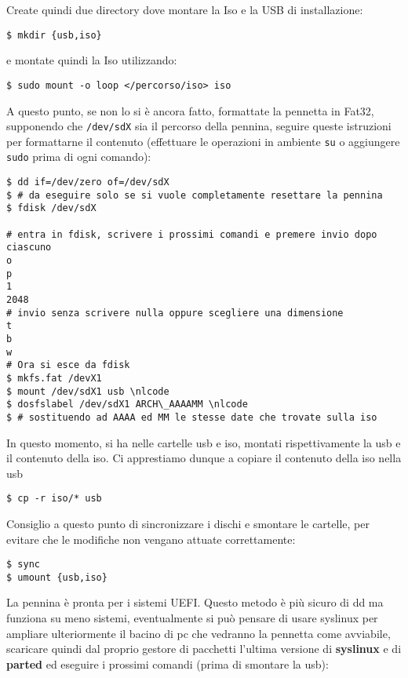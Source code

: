 \documentclass[twoside,italian]{book}
\newcommand{\code}[1]{\texttt{#1}}
\newcommand{\nlcode}{\\ \$$\quad$}
\begin{document}
    Create quindi due directory dove montare la Iso e la USB di installazione:
    \begin{lstlisting}
$ mkdir {usb,iso}
    \end{lstlisting}
    e montate quindi la Iso utilizzando: 
    \begin{lstlisting}
$ sudo mount -o loop </percorso/iso> iso
    \end{lstlisting}
    A questo punto, se non lo si è ancora fatto, formattate la pennetta in Fat32, supponendo che \code{/dev/sdX} sia il percorso della pennina, seguire queste istruzioni per formattarne il contenuto (effettuare le operazioni in ambiente \code{su} o aggiungere \code{sudo} prima di ogni comando):

    
\begin{lstlisting}
$ dd if=/dev/zero of=/dev/sdX
$ # da eseguire solo se si vuole completamente resettare la pennina
$ fdisk /dev/sdX

# entra in fdisk, scrivere i prossimi comandi e premere invio dopo ciascuno
o
p
1
2048
# invio senza scrivere nulla oppure scegliere una dimensione
t
b
w
# Ora si esce da fdisk
$ mkfs.fat /devX1
$ mount /dev/sdX1 usb \nlcode
$ dosfslabel /dev/sdX1 ARCH\_AAAAMM \nlcode
$ # sostituendo ad AAAA ed MM le stesse date che trovate sulla iso
\end{lstlisting}
    
    In questo momento, si ha nelle cartelle usb e iso, montati rispettivamente la usb e il contenuto della iso. Ci apprestiamo dunque a copiare il contenuto della iso nella usb

    \begin{lstlisting}
$ cp -r iso/* usb
    \end{lstlisting}

    Consiglio a questo punto di sincronizzare  i dischi e smontare le cartelle, per evitare che le modifiche non vengano attuate correttamente:

    \begin{lstlisting}
$ sync 
$ umount {usb,iso}
    \end{lstlisting}

    La pennina è pronta per i sistemi \ac{UEFI}. Questo metodo è più sicuro di dd ma funziona su meno sistemi, eventualmente si può pensare di usare syslinux per ampliare ulteriormente il bacino di pc che vedranno la pennetta come avviabile, scaricare quindi dal proprio gestore di pacchetti l'ultima versione di \textbf{syslinux} e di \textbf{parted} ed eseguire i prossimi comandi (prima di smontare la usb):
\end{document}
